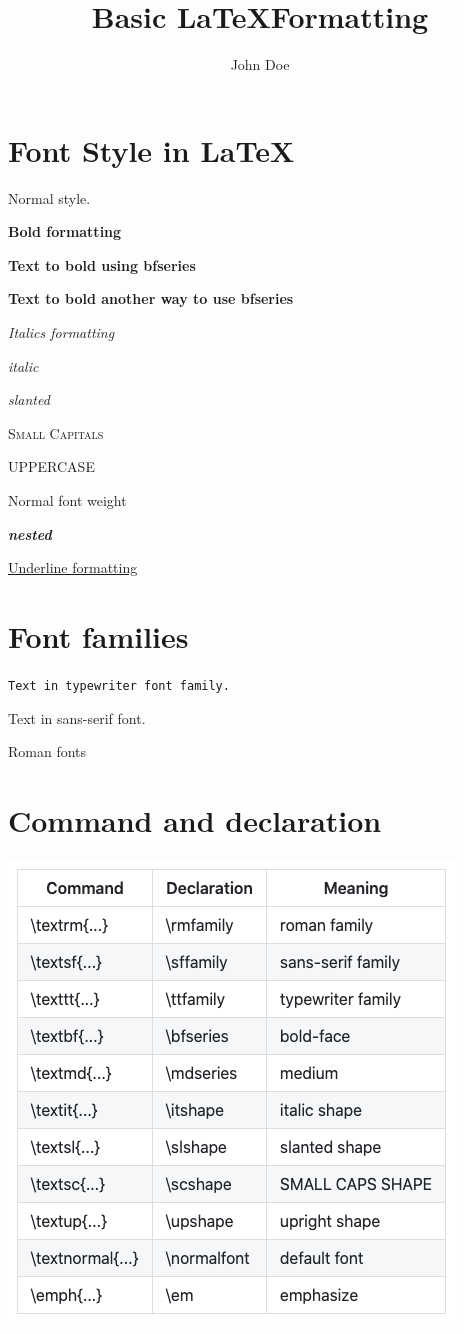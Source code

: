 \documentclass{article}
\title{Basic \LaTeX Formatting}
\author{John Doe}
\date{}
\begin{document}
\section{Font Style in \LaTeX}

Normal style.

\textbf{Bold formatting}

{\bfseries Text to bold using bfseries}

\bfseries Text to bold another way to use bfseries \mdseries

\emph{Italics formatting}

\textit{italic}

\textsl{slanted}

\textsc{Small Capitals}

\uppercase{Uppercase}

\textmd{Normal font weight}

\textit{\textbf{nested}}

\underline{Underline formatting}

\section{Font families}
\texttt{Text in typewriter font family.}


\textsf{Text in sans-serif font.}


\textrm{Roman fonts}

\section{Command and declaration}

\includegraphics[scale=0.5]{image/commands.png}
\end{document}
